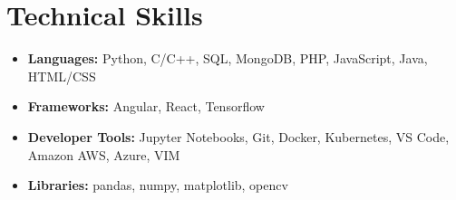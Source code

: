 \documentclass[hidelinks,letterpaper,10pt]{article}
\newcommand{\resumeSubHeadingListStart}{\begin{itemize}[leftmargin=*,label={}]}
\newcommand{\resumeSubHeadingListEnd}{\end{itemize}}
\begin{document}
\section{Technical Skills}
\resumeSubHeadingListStart
\itemsep=-0.3em
\item {\textbf{Languages:} Python, C/C++, SQL, MongoDB, PHP, JavaScript, Java, HTML/CSS}
\item {\textbf{Frameworks:} Angular, React, Tensorflow}
\item {\textbf{Developer Tools:} Jupyter Notebooks, Git, Docker, Kubernetes, VS Code, Amazon AWS, Azure, VIM}
\item {\textbf{Libraries:} pandas, numpy, matplotlib, opencv}
\resumeSubHeadingListEnd
\end{document}
